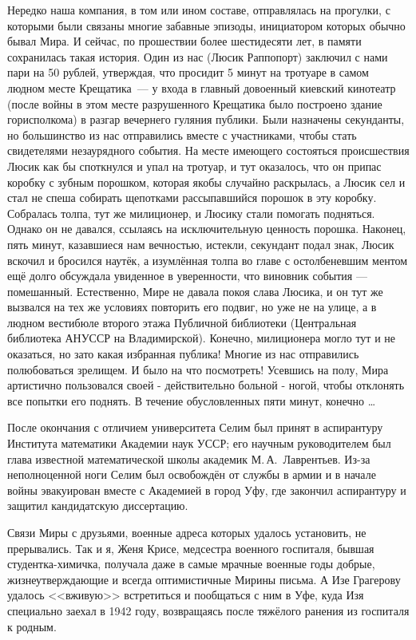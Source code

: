 Нередко наша компания, в том или ином составе, отправлялась на прогулки, с которыми были связаны многие забавные эпизоды, инициатором которых обычно бывал Мира. И сейчас, по прошествии более шестидесяти лет, в памяти сохранилась такая история. Один из нас (Люсик Раппопорт) заключил с нами пари на 50 рублей, утверждая, что просидит 5 минут на тротуаре в самом людном месте Крещатика~--- у входа в главный довоенный киевский кинотеатр (после войны в этом месте разрушенного Крещатика было построено здание горисполкома) в разгар вечернего гуляния публики. Были назначены секунданты, но большинство из нас отправились вместе с участниками, чтобы стать свидетелями незаурядного события. На месте имеющего состояться происшествия Люсик как бы споткнулся и упал на тротуар, и тут оказалось, что он припас коробку с зубным порошком, которая якобы случайно раскрылась, а Люсик сел и стал не спеша собирать щепотками рассыпавшийся порошок в эту коробку. Собралась толпа, тут же милиционер, и Люсику стали помогать подняться. Однако он не давался, ссылаясь на исключительную ценность порошка. Наконец, пять минут, казавшиеся нам вечностью, истекли, секундант подал знак, Люсик вскочил и бросился наутёк, а изумлённая толпа во главе с остолбеневшим ментом ещё долго обсуждала увиденное в уверенности, что виновник события --- помешанный. Естественно, Мире не давала покоя слава Люсика, и он тут же вызвался на тех же условиях повторить его подвиг, но уже не на улице, а в людном вестибюле второго этажа Публичной библиотеки (Центральная библиотека АН\linebreak УССР на Владимирской). Конечно, милиционера могло тут и не оказаться, но зато какая избранная публика! Многие из нас отправились полюбоваться зрелищем. И было на что посмотреть! Усевшись на полу, Мира артистично пользовался своей - действительно больной - ногой, чтобы отклонять все попытки его поднять. В течение обусловленных пяти минут, конечно \ldots

После окончания с отличием университета Селим был принят в аспирантуру Института математики Академии наук УССР; его научным руководителем был глава известной математической школы академик М.\,А.~Лаврентьев. Из-за неполноценной ноги Селим был освобождён от службы в армии и в начале войны эвакуирован вместе с Академией в город Уфу, где закончил аспирантуру и защитил
кандидатскую диссертацию.

Связи Миры с друзьями, военные адреса которых удалось установить, не прерывались. Так и я, Женя Крисе, медсестра военного госпиталя, бывшая студентка-химичка, получала даже в самые мрачные военные годы добрые, жизнеутверждающие и всегда оптимистичные Мирины письма. А Изе Грагерову удалось <<вживую>> встретиться и пообщаться с ним в Уфе, куда Изя специально заехал в 1942 году, возвращаясь после тяжёлого ранения из госпиталя к родным.

